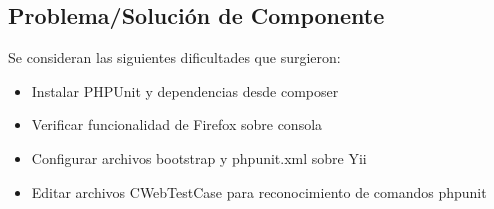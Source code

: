 \subsection{Problema/Soluci\'{o}n de Componente}

Se consideran las siguientes dificultades que surgieron:

\begin{itemize}

\item Instalar PHPUnit y dependencias desde composer
\item Verificar funcionalidad de Firefox sobre consola
\item Configurar archivos bootstrap y phpunit.xml sobre Yii
\item Editar archivos CWebTestCase para reconocimiento de comandos phpunit

\end{itemize}

